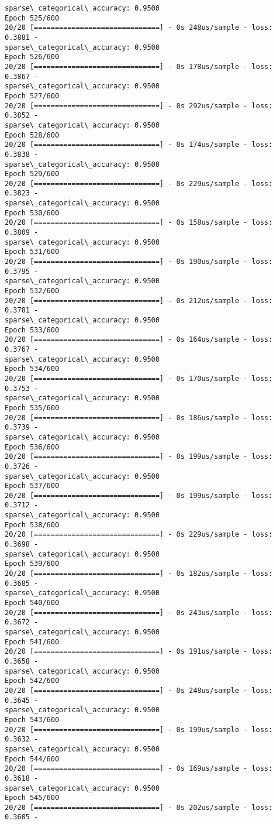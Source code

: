 \documentclass[11pt]{article}
\begin{document}
\begin{Verbatim}[commandchars=\\\{\}]
sparse\_categorical\_accuracy: 0.9500
Epoch 525/600
20/20 [==============================] - 0s 248us/sample - loss: 0.3881 -
sparse\_categorical\_accuracy: 0.9500
Epoch 526/600
20/20 [==============================] - 0s 178us/sample - loss: 0.3867 -
sparse\_categorical\_accuracy: 0.9500
Epoch 527/600
20/20 [==============================] - 0s 292us/sample - loss: 0.3852 -
sparse\_categorical\_accuracy: 0.9500
Epoch 528/600
20/20 [==============================] - 0s 174us/sample - loss: 0.3838 -
sparse\_categorical\_accuracy: 0.9500
Epoch 529/600
20/20 [==============================] - 0s 229us/sample - loss: 0.3823 -
sparse\_categorical\_accuracy: 0.9500
Epoch 530/600
20/20 [==============================] - 0s 158us/sample - loss: 0.3809 -
sparse\_categorical\_accuracy: 0.9500
Epoch 531/600
20/20 [==============================] - 0s 190us/sample - loss: 0.3795 -
sparse\_categorical\_accuracy: 0.9500
Epoch 532/600
20/20 [==============================] - 0s 212us/sample - loss: 0.3781 -
sparse\_categorical\_accuracy: 0.9500
Epoch 533/600
20/20 [==============================] - 0s 164us/sample - loss: 0.3767 -
sparse\_categorical\_accuracy: 0.9500
Epoch 534/600
20/20 [==============================] - 0s 170us/sample - loss: 0.3753 -
sparse\_categorical\_accuracy: 0.9500
Epoch 535/600
20/20 [==============================] - 0s 186us/sample - loss: 0.3739 -
sparse\_categorical\_accuracy: 0.9500
Epoch 536/600
20/20 [==============================] - 0s 199us/sample - loss: 0.3726 -
sparse\_categorical\_accuracy: 0.9500
Epoch 537/600
20/20 [==============================] - 0s 199us/sample - loss: 0.3712 -
sparse\_categorical\_accuracy: 0.9500
Epoch 538/600
20/20 [==============================] - 0s 229us/sample - loss: 0.3698 -
sparse\_categorical\_accuracy: 0.9500
Epoch 539/600
20/20 [==============================] - 0s 182us/sample - loss: 0.3685 -
sparse\_categorical\_accuracy: 0.9500
Epoch 540/600
20/20 [==============================] - 0s 243us/sample - loss: 0.3672 -
sparse\_categorical\_accuracy: 0.9500
Epoch 541/600
20/20 [==============================] - 0s 191us/sample - loss: 0.3658 -
sparse\_categorical\_accuracy: 0.9500
Epoch 542/600
20/20 [==============================] - 0s 248us/sample - loss: 0.3645 -
sparse\_categorical\_accuracy: 0.9500
Epoch 543/600
20/20 [==============================] - 0s 199us/sample - loss: 0.3632 -
sparse\_categorical\_accuracy: 0.9500
Epoch 544/600
20/20 [==============================] - 0s 169us/sample - loss: 0.3618 -
sparse\_categorical\_accuracy: 0.9500
Epoch 545/600
20/20 [==============================] - 0s 202us/sample - loss: 0.3605 -

\end{Verbatim}
\end{document}
